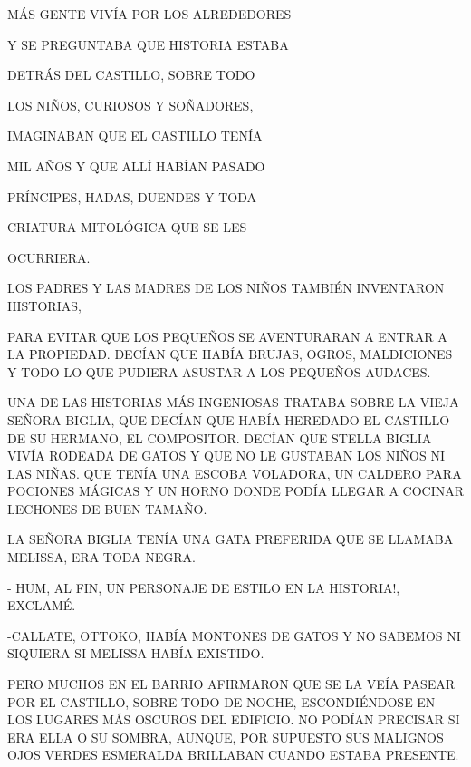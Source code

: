 MÁS GENTE VIVÍA POR LOS ALREDEDORES 

Y SE PREGUNTABA QUE HISTORIA ESTABA

DETRÁS DEL CASTILLO, SOBRE TODO 

LOS
NIÑOS, CURIOSOS Y SOÑADORES, 

IMAGINABAN QUE EL CASTILLO TENÍA 

MIL AÑOS Y QUE ALLÍ HABÍAN PASADO

PRÍNCIPES,  
HADAS, DUENDES Y TODA 

CRIATURA MITOLÓGICA QUE SE LES 

OCURRIERA.

\newpage
{}
LOS PADRES Y LAS MADRES DE LOS NIÑOS TAMBIÉN INVENTARON HISTORIAS,

PARA EVITAR QUE LOS PEQUEÑOS SE AVENTURARAN A ENTRAR A LA PROPIEDAD. DECÍAN QUE HABÍA BRUJAS, OGROS, MALDICIONES Y TODO LO QUE PUDIERA ASUSTAR A LOS PEQUEÑOS AUDACES.

UNA DE LAS HISTORIAS MÁS INGENIOSAS TRATABA SOBRE LA VIEJA SEÑORA BIGLIA, QUE DECÍAN QUE HABÍA HEREDADO EL CASTILLO DE SU HERMANO, EL COMPOSITOR. DECÍAN QUE STELLA BIGLIA VIVÍA RODEADA DE GATOS Y QUE NO LE GUSTABAN LOS NIÑOS NI LAS NIÑAS. QUE TENÍA UNA ESCOBA VOLADORA, UN CALDERO PARA POCIONES MÁGICAS Y UN HORNO DONDE PODÍA LLEGAR A COCINAR LECHONES DE BUEN TAMAÑO.

LA SEÑORA BIGLIA TENÍA UNA GATA PREFERIDA QUE SE LLAMABA MELISSA, ERA TODA NEGRA.

- HUM, AL FIN, UN PERSONAJE DE ESTILO EN LA HISTORIA!, EXCLAMÉ.
\newpage
{}
-CALLATE, OTTOKO, HABÍA MONTONES DE GATOS Y NO SABEMOS NI SIQUIERA SI MELISSA HABÍA EXISTIDO.

PERO MUCHOS EN EL BARRIO AFIRMARON QUE SE LA VEÍA PASEAR POR EL CASTILLO, SOBRE TODO DE NOCHE, ESCONDIÉNDOSE EN LOS LUGARES MÁS OSCUROS DEL EDIFICIO. NO PODÍAN PRECISAR SI ERA ELLA O SU SOMBRA, AUNQUE, POR SUPUESTO SUS MALIGNOS OJOS VERDES ESMERALDA BRILLABAN CUANDO ESTABA PRESENTE.

